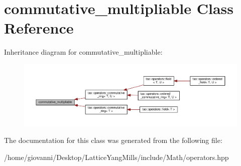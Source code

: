 \hypertarget{classcommutative__multipliable}{}\section{commutative\+\_\+multipliable Class Reference}
\label{classcommutative__multipliable}


Inheritance diagram for commutative\+\_\+multipliable\+:\nopagebreak
\begin{figure}[H]
\begin{center}
\leavevmode
\includegraphics[width=350pt]{classcommutative__multipliable__inherit__graph}
\end{center}
\end{figure}


The documentation for this class was generated from the following file\+:\begin{DoxyCompactItemize}
\item 
/home/giovanni/\+Desktop/\+Lattice\+Yang\+Mills/include/\+Math/operators.\+hpp\end{DoxyCompactItemize}
